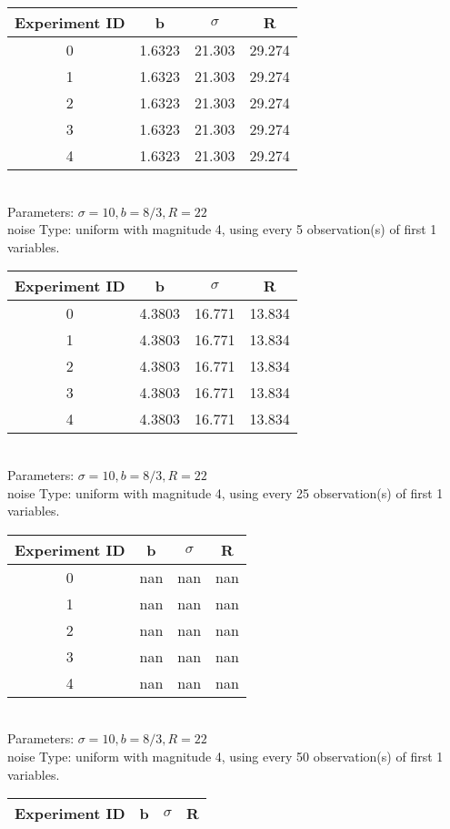 \begin{multicols}{3}
\begin{tabular}{cccc}
\hline Experiment ID & b & $\sigma$ & R \\ \hline 
0 & 1.6323 & 21.303 & 29.274\\ \hline 
 1 & 1.6323 & 21.303 & 29.274\\ \hline 
 2 & 1.6323 & 21.303 & 29.274\\ \hline 
 3 & 1.6323 & 21.303 & 29.274\\ \hline 
 4 & 1.6323 & 21.303 & 29.274\\ \hline 
 \end{tabular}\\
Parameters: $\sigma=10, b=8/3, R=22$\\
noise Type: uniform with magnitude 4, using every 5 observation(s) of first 1 variables.\\
\begin{tabular}{cccc}
\hline Experiment ID & b & $\sigma$ & R \\ \hline 
0 & 4.3803 & 16.771 & 13.834\\ \hline 
 1 & 4.3803 & 16.771 & 13.834\\ \hline 
 2 & 4.3803 & 16.771 & 13.834\\ \hline 
 3 & 4.3803 & 16.771 & 13.834\\ \hline 
 4 & 4.3803 & 16.771 & 13.834\\ \hline 
 \end{tabular}\\
Parameters: $\sigma=10, b=8/3, R=22$\\
noise Type: uniform with magnitude 4, using every 25 observation(s) of first 1 variables.\\
\begin{tabular}{cccc}
\hline Experiment ID & b & $\sigma$ & R \\ \hline 
0 & nan & nan & nan\\ \hline 
 1 & nan & nan & nan\\ \hline 
 2 & nan & nan & nan\\ \hline 
 3 & nan & nan & nan\\ \hline 
 4 & nan & nan & nan\\ \hline 
 \end{tabular}\\
Parameters: $\sigma=10, b=8/3, R=22$\\
noise Type: uniform with magnitude 4, using every 50 observation(s) of first 1 variables.\\
\begin{tabular}{cccc}
\hline Experiment ID & b & $\sigma$ & R \\ \hline 

\end{tabular}
\end{multicols}
